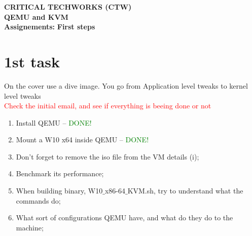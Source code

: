 \documentclass[11pt, a4paper, oneside]{article}
\date{} %
\theoremstyle{definition}
\begin{document}
\sloppy
\justifying


\fancyhead{}

\Large\textbf{CRITICAL TECHWORKS (CTW)}\\
\singlespacing
\Large\textbf{QEMU and KVM}\\

\singlespacing
\singlespacing
\singlespacing
\textbf{Assignements:}
\singlespacing
\indent\indent\indent\indent \textbf{First steps}


\vfill
\pagebreak
\section*{1st task}

On the cover use a dive image. You go from Application level tweaks to kernel level tweaks\\
\textcolor{red}{Check the initial email, and see if everything is beeing done or not}\\

\begin{enumerate}
	\item Install QEMU -- \textcolor{green}{DONE!}
	\item Mount a W10 x64 inside QEMU -- \textcolor{green}{DONE!}
	\item Don't forget to remove the iso file from the VM details (i);	
	\item Benchmark its performance;
	\item When building binary, W10$\_$x86-64$\_$KVM.sh, try to understand what the commands do;
	\item What sort of configurations QEMU have, and what do they do to the machine;
\end{enumerate}
\end{document}
